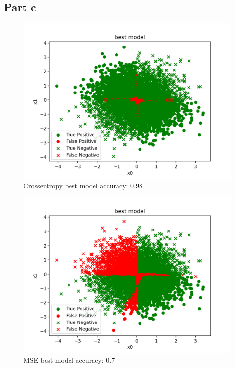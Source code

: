 \newpage
\subsection*{Part c}
\begin{figure}[!h]
    \centering\includegraphics[width=0.8\linewidth]{crossentropy_best_model.png}
    \caption[short]{Crossentropy best model accuracy: 0.98}
\end{figure}

\begin{figure}[!h]
    \centering\includegraphics[width=0.8\linewidth]{mse_best_model.png}
    \caption[short]{MSE best model accuracy: 0.7}
\end{figure}